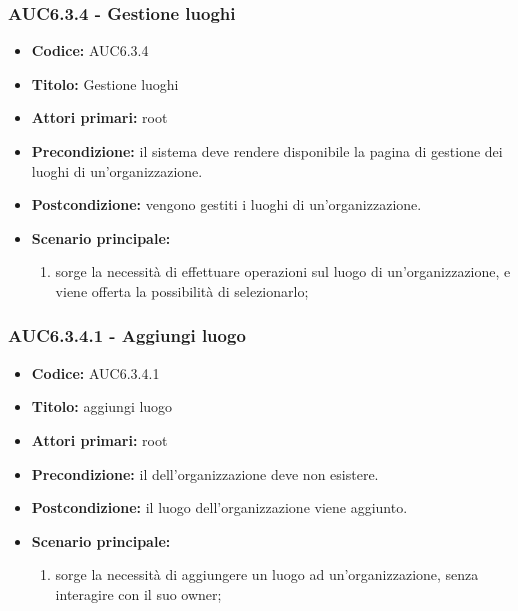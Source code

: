 \documentclass[casi-duso]{subfiles}
\begin{document}
\subsubsection{AUC6.3.4 - Gestione luoghi}%
\label{subsub:AUC6.3.4}
\begin{itemize}
  \item \textbf{Codice:} AUC6.3.4
  \item \textbf{Titolo:} Gestione luoghi
  \item \textbf{Attori primari:} root
  \item \textbf{Precondizione:} il sistema deve rendere disponibile la pagina di gestione dei luoghi di un'organizzazione.
  \item \textbf{Postcondizione:} vengono gestiti i luoghi di un'organizzazione.
  \item \textbf{Scenario principale:}
  \begin{enumerate}
    \item sorge la necessità di effettuare operazioni sul luogo di un'organizzazione, e viene offerta la possibilità di selezionarlo;
  \end{enumerate}
\end{itemize}

\subsubsection{AUC6.3.4.1 - Aggiungi luogo}%
\label{subsub:AUC6.3.4.1}
\begin{itemize}
  \item \textbf{Codice:} AUC6.3.4.1
  \item \textbf{Titolo:} aggiungi luogo
  \item \textbf{Attori primari:} root
  \item \textbf{Precondizione:} il  dell'organizzazione deve non esistere.
  \item \textbf{Postcondizione:} il luogo dell'organizzazione viene aggiunto.
  \item \textbf{Scenario principale:}
  \begin{enumerate}
    \item sorge la necessità di aggiungere un luogo ad un'organizzazione, senza interagire con il suo owner;
  \end{enumerate}
\end{itemize}
\end{document}

